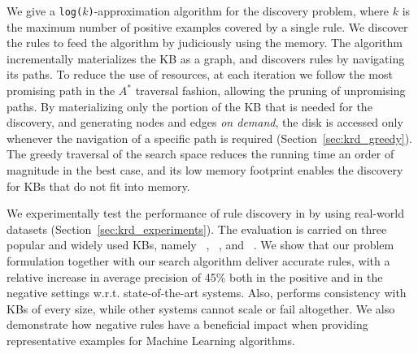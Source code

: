 \vspace{0.5ex}
We give a \texttt{log($k$)}-approximation algorithm for the discovery problem, %
where $k$ is the maximum number of positive examples covered by a single rule. We discover the rules to feed the algorithm by judiciously using the memory. The algorithm incrementally 
materializes the KB as a graph, and discovers rules by navigating its paths. To reduce the use of resources, at each iteration we follow the most promising path in the $A^*$ traversal fashion, allowing the pruning of unpromising paths.	
By materializing only the portion of the KB that is needed for the discovery, and generating nodes and edges \emph{on demand}, the disk is accessed only whenever the navigation of a specific path is required (Section~\ref{sec:krd_greedy}). 
The greedy traversal of the search space reduces the running time an order of magnitude in the best case, and its low memory footprint enables the discovery for KBs that do not fit into memory.



\vspace{1ex}
We experimentally test the performance of rule discovery in \krd by using real-world datasets (Section~\ref{sec:krd_experiments}). The evaluation is carried on  three popular and widely used KBs, namely \dbpedia~\cite{bizer2009dbpedia}, \yago~\cite{suchanek2007yago}, and \wikidata~\cite{vrandevcic2014wikidata}. 
We show that our problem formulation together with our 
search algorithm deliver accurate rules, 
with a relative increase in average precision of 45\% both in the positive and in the negative settings w.r.t. state-of-the-art systems.
Also, \krd performs consistency with KBs of every size, while other systems cannot scale or fail altogether. %
We also 
demonstrate how negative rules have a beneficial impact when providing representative examples for Machine Learning algorithms.




